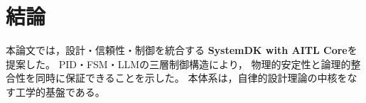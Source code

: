 \section{結論}
本論文では，設計・信頼性・制御を統合する
\textbf{SystemDK with AITL Core}を提案した。
PID・FSM・LLMの三層制御構造により，
物理的安定性と論理的整合性を同時に保証できることを示した。
本体系は，自律的設計理論の中核をなす工学的基盤である。
